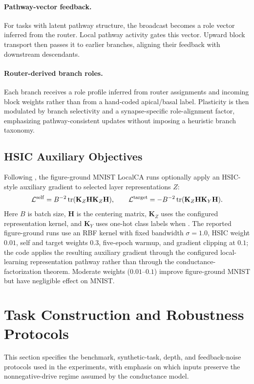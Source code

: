     \paragraph{Pathway-vector feedback.}
    For tasks with latent pathway structure, the broadcast becomes a role vector inferred from the router. Local pathway activity gates this vector. Upward block transport then passes it to earlier branches, aligning their feedback with downstream descendants.
    
    \paragraph{Router-derived branch roles.}
    Each branch receives a role profile inferred from router assignments and incoming block weights rather than from a hand-coded apical/basal label.
    Plasticity is then modulated by branch selectivity and a synapse-specific role-alignment factor, emphasizing pathway-consistent updates without imposing a heuristic branch taxonomy.
    
    \subsection{HSIC Auxiliary Objectives}
    
    Following \cite{gretton2005hsic}, the figure-ground MNIST LocalCA runs optionally apply an HSIC-style auxiliary gradient to selected layer representations $Z$:
    \[
    \mathcal{L}^{\mathrm{self}} = B^{-2}\operatorname{tr}(\mathbf{K}_Z\mathbf{H}\mathbf{K}_Z\mathbf{H}),
    \qquad
    \mathcal{L}^{\mathrm{target}} = -B^{-2}\operatorname{tr}(\mathbf{K}_Z\mathbf{H}\mathbf{K}_Y\mathbf{H}).
    \]
    Here $B$ is batch size, $\mathbf{H}$ is the centering matrix, $\mathbf{K}_Z$ uses the configured representation kernel, and $\mathbf{K}_Y$ uses one-hot class labels when . The reported figure-ground runs use an RBF kernel with fixed bandwidth $\sigma=1.0$, HSIC weight $0.01$, self and target weights $0.3$, five-epoch warmup, and gradient clipping at $0.1$; the code applies the resulting auxiliary gradient through the configured local-learning representation pathway rather than through the conductance-factorization theorem. Moderate weights ($0.01$--$0.1$) improve figure-ground MNIST but have negligible effect on MNIST.
    
    \section{Task Construction and Robustness Protocols}
    \label{app:synthetic_tasks}
    This section specifies the benchmark, synthetic-task, depth, and feedback-noise protocols used in the experiments, with emphasis on which inputs preserve the nonnegative-drive regime assumed by the conductance model.
    
